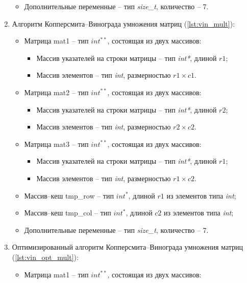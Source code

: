 \begin{enumerate}
\begin{itemize}
        \item Дополнительные переменные -- тип \textit{size\_t}, количество -- 7.
    \end{itemize}
    \item Алгоритм Копперсмита--Винограда умножения матриц (\ref{lst:vin_mult}):
    \begin{itemize}
        \item Матрица mat1 -- тип \textit{$int^{**}$}, состоящая из двух массивов:
        \begin{itemize}
            \item Массив указателей на строки матрицы -- тип \textit{int*}, длиной \( r1 \);
            \item Массив элементов -- тип \textit{int}, размерностью \( r1 \times c1 \).
        \end{itemize}
        \item Матрица mat2 -- тип \textit{$int^{**}$}, состоящая из двух массивов:
        \begin{itemize}
            \item Массив указателей на строки матрицы -- тип \textit{int*}, длиной \( r2 \);
            \item Массив элементов -- тип \textit{int}, размерностью \( r2 \times c2 \).
        \end{itemize}
        \item Матрица mat3 -- тип \textit{$int^{**}$}, состоящая из двух массивов:
        \begin{itemize}
            \item Массив указателей на строки матрицы -- тип \textit{int*}, длиной \( r1 \);
            \item Массив элементов -- тип \textit{int}, размерностью \( r1 \times c2 \).
        \end{itemize}
        \item Массив--кеш tmp\_row -- тип \textit{$int^{*}$}, длиной \( r1 \) из элементов типа \textit{int};
        \item Массив--кеш tmp\_col -- тип \textit{$int^{*}$}, длиной \( c2 \) из элементов типа \textit{int};
        \item Дополнительные переменные -- тип \textit{size\_t}, количество -- 7.
    \end{itemize}
    \item Оптимизированный алгоритм Копперсмита--Винограда умножения матриц (\ref{lst:vin_opt_mult}):
    \begin{itemize}
        \item Матрица mat1 -- тип \textit{$int^{**}$}, состоящая из двух массивов:

\end{itemize}
\end{enumerate}

